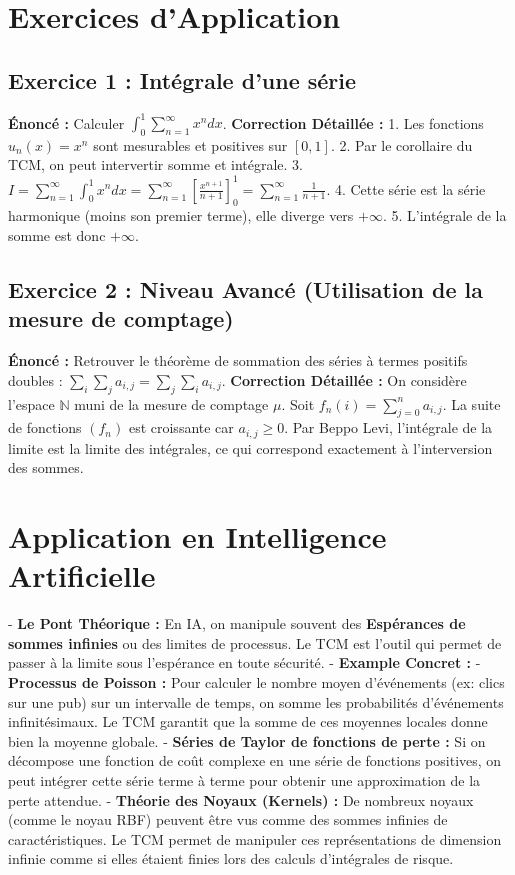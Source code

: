 \documentclass[11pt,a4paper]{article}
\begin{document}
\section{Exercices d'Application}

\subsection{Exercice 1 : Intégrale d'une série}
\textbf{Énoncé :} Calculer $\int_0^1 \sum_{n=1}^\infty x^n dx$.
\textbf{Correction Détaillée :}
1. Les fonctions $u_n(x) = x^n$ sont mesurables et positives sur $[0, 1]$.
2. Par le corollaire du TCM, on peut intervertir somme et intégrale.
3. $I = \sum_{n=1}^\infty \int_0^1 x^n dx = \sum_{n=1}^\infty \left[ \frac{x^{n+1}}{n+1} \right]_0^1 = \sum_{n=1}^\infty \frac{1}{n+1}$.
4. Cette série est la série harmonique (moins son premier terme), elle diverge vers $+\infty$.
5. L'intégrale de la somme est donc $+\infty$.

\subsection{Exercice 2 : Niveau Avancé (Utilisation de la mesure de comptage)}
\textbf{Énoncé :} Retrouver le théorème de sommation des séries à termes positifs doubles : $\sum_{i} \sum_{j} a_{i,j} = \sum_{j} \sum_{i} a_{i,j}$.
\textbf{Correction Détaillée :}
On considère l'espace $\mathbb{N}$ muni de la mesure de comptage $\mu$. Soit $f_n(i) = \sum_{j=0}^n a_{i,j}$. La suite de fonctions $(f_n)$ est croissante car $a_{i,j} \ge 0$. Par Beppo Levi, l'intégrale de la limite est la limite des intégrales, ce qui correspond exactement à l'interversion des sommes.

\section{Application en Intelligence Artificielle}

- \textbf{Le Pont Théorique :} En IA, on manipule souvent des \textbf{Espérances de sommes infinies} ou des limites de processus. Le TCM est l'outil qui permet de passer à la limite sous l'espérance en toute sécurité.
- \textbf{Example Concret :}
    - \textbf{Processus de Poisson :} Pour calculer le nombre moyen d'événements (ex: clics sur une pub) sur un intervalle de temps, on somme les probabilités d'événements infinitésimaux. Le TCM garantit que la somme de ces moyennes locales donne bien la moyenne globale.
    - \textbf{Séries de Taylor de fonctions de perte :} Si on décompose une fonction de coût complexe en une série de fonctions positives, on peut intégrer cette série terme à terme pour obtenir une approximation de la perte attendue.
    - \textbf{Théorie des Noyaux (Kernels) :} De nombreux noyaux (comme le noyau RBF) peuvent être vus comme des sommes infinies de caractéristiques. Le TCM permet de manipuler ces représentations de dimension infinie comme si elles étaient finies lors des calculs d'intégrales de risque.
\end{document}
